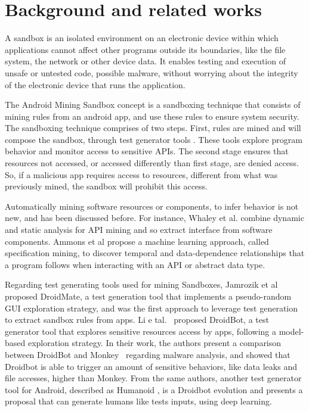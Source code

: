 \section{Background and related works}

A sandbox is an isolated environment on an electronic device within which applications cannot affect other programs outside its boundaries, like the file system, the network or other device data. It enables testing and execution of unsafe or untested code, possible malware, without worrying about the integrity of the electronic device that runs the application. 


The Android Mining Sandbox concept is a sandboxing technique that consists of mining rules from an android app, and use these rules to ensure system security. The sandboxing technique comprises of two steps. First, rules are mined and will compose the sandbox,
through test generator tools  . These tools explore program behavior and monitor access to sensitive APIs. The second stage ensures that resources not accessed, or accessed differently than first stage, are denied access. So, if a malicious app requires access to resources, different from what was previously mined, the sandbox will prohibit this access.

Automatically mining software resources or components, to infer behavior is not new, and has been discussed before. For instance, Whaley et al. \cite{DBLP:conf/issta/WhaleyML02} combine dynamic and static analysis for API mining and so extract interface from software components. Ammons et al \cite{DBLP:conf/popl/AmmonsBL02} propose a machine learning
approach, called specification mining, to discover temporal and data-dependence relationships that a program follows when interacting with an API or abstract data type.

Regarding test generating tools used for mining Sandboxes, Jamrozik et al \cite{DBLP:conf/icse/JamrozikZ16} proposed DroidMate, a test generation tool that implements a pseudo-random GUI exploration strategy, and was the first approach to leverage test generation to extract sandbox rules from apps. Li e tal.~\cite{DBLP:conf/icse/LiYGC17} proposed DroidBot, a test generator tool that explores sensitive resources access by apps, following a model-based exploration strategy. In their work, the authors present a comparison between DroidBot and Monkey~\cite{Monkey} regarding malware analysis, and showed that Droidbot is able to trigger an amount of sensitive behaviors, like data leaks and file accesses, higher than Monkey. From the same authors, another test generator tool for Android, described as Humanoid \cite{DBLP:conf/kbse/LiY0C19}, is a Droidbot evolution and presents a proposal that can generate humans like tests inputs, using deep learning.

